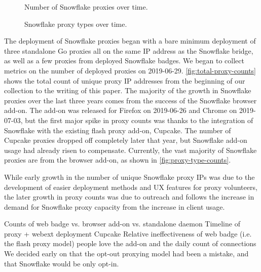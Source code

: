 \documentclass[letterpaper,twocolumn]{article}
\begin{document}
\begin{figure}
\caption{Number of Snowflake proxies over time.}
\label{fig:total-proxy-counts}
\bigskip
{}
\caption{Snowflake proxy types over time.}
\label{fig:proxy-type-counts}
\end{figure}

The deployment of Snowflake proxies began with a bare minimum deployment
of three standalone Go proxies all on the same IP address as the Snowflake bridge,
as well as a few proxies from deployed Snowflake badges.
We began to collect metrics on the number of deployed proxies on \mbox{2019-06-29}.
\autoref{fig:total-proxy-counts} shows the total count of unique proxy IP addresses
from the beginning of our collection to the writing of this paper.
The majority of the growth in Snowflake proxies over the last three years comes from
the success of the Snowflake browser add-on.
The add-on was released for Firefox on \mbox{2019-06-26} and Chrome on \mbox{2019-07-03},
but the first major spike in proxy counts was thanks to the integration
of Snowflake with the existing flash proxy add-on, Cupcake.
The number of Cupcake proxies dropped off completely later that year,
but Snowflake add-on usage had already risen to compensate.
Currently, the vast majority of Snowflake proxies are from the browser add-on,
as shown in \autoref{fig:proxy-type-counts}.

While early growth in the number of unique Snowflake proxy IPs
was due to the development of easier deployment methods and UX features for proxy volunteers,
the later growth in proxy counts was due to outreach
and follows the increase in demand for Snowflake proxy capacity from the increase in client usage. 

Counts of web badge vs. browser add-on vs. standalone daemon
Timeline of proxy + webext deployment
Cupcake
Relative ineffectiveness of web badge (i.e. the flash proxy model)
people love the add-on and the daily count of connections
We decided early on that the opt-out proxying model had been a mistake,
and that Snowflake would be only opt-in.
\end{document}
